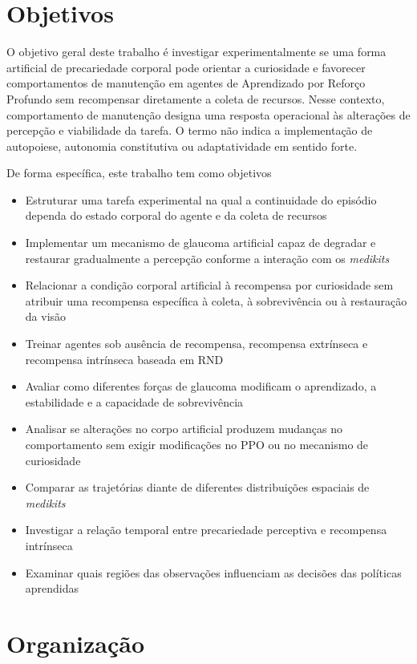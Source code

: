 \section{Objetivos}

O objetivo geral deste trabalho é investigar experimentalmente se uma forma artificial de precariedade corporal pode orientar a curiosidade e favorecer comportamentos de manutenção em agentes de Aprendizado por Reforço Profundo sem recompensar diretamente a coleta de recursos. Nesse contexto, comportamento de manutenção designa uma resposta operacional às alterações de percepção e viabilidade da tarefa. O termo não indica a implementação de autopoiese, autonomia constitutiva ou adaptatividade em sentido forte.

De forma específica, este trabalho tem como objetivos

\begin{itemize}
	\item Estruturar uma tarefa experimental na qual a continuidade do episódio dependa do estado corporal do agente e da coleta de recursos
	\item Implementar um mecanismo de glaucoma artificial capaz de degradar e restaurar gradualmente a percepção conforme a interação com os \textit{medikits}
	\item Relacionar a condição corporal artificial à recompensa por curiosidade sem atribuir uma recompensa específica à coleta, à sobrevivência ou à restauração da visão
	\item Treinar agentes sob ausência de recompensa, recompensa extrínseca e recompensa intrínseca baseada em RND
	\item Avaliar como diferentes forças de glaucoma modificam o aprendizado, a estabilidade e a capacidade de sobrevivência
	\item Analisar se alterações no corpo artificial produzem mudanças no comportamento sem exigir modificações no PPO ou no mecanismo de curiosidade
	\item Comparar as trajetórias diante de diferentes distribuições espaciais de \textit{medikits}
	\item Investigar a relação temporal entre precariedade perceptiva e recompensa intrínseca
	\item Examinar quais regiões das observações influenciam as decisões das políticas aprendidas
\end{itemize}

\section{Organização}


